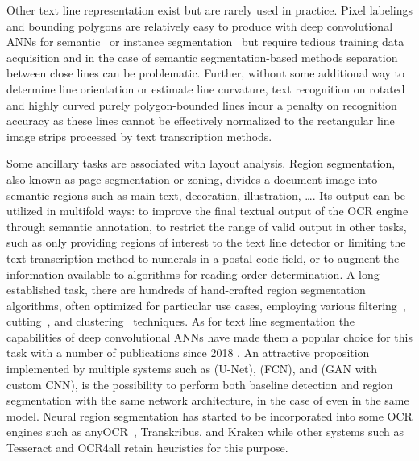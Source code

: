 Other text line representation exist but are rarely used in practice. Pixel
labelings and bounding polygons are relatively easy to produce with deep
convolutional ANNs for semantic~\cite{pastor2016complete,alberti2019labeling}
or instance segmentation~\cite{prusty2019indiscapes} but require tedious
training data acquisition and in the case of semantic segmentation-based
methods separation between close lines can be problematic. Further, without
some additional way to determine line orientation or estimate line curvature,
text recognition on rotated and highly curved purely polygon-bounded lines
incur a penalty on recognition accuracy as these lines cannot be effectively
normalized to the rectangular line image strips processed by text transcription
methods. 

Some ancillary tasks are associated with layout analysis. Region segmentation,
also known as page segmentation or zoning, divides a document image into
semantic regions such as main text, decoration, illustration, \dots. Its output
can be utilized in multifold ways: to improve the final textual output of the
OCR engine through semantic annotation, to restrict the range of valid output
in other tasks, such as only providing regions of interest to the text line
detector or limiting the text transcription method to numerals in a postal code
field, or to augment the information available to algorithms for reading order
determination. A long-established task, there are hundreds of hand-crafted
region segmentation algorithms, often optimized for particular use cases,
employing various filtering~\cite{PAVLIDIS1992484},
cutting~\cite{ha1995recursive,kruatrachue2005fast}, and
clustering~\cite{drivas1995page,kise1998segmentation} techniques. As for text
line segmentation the capabilities of deep convolutional ANNs have made them a
popular choice for this task with a number of publications since 2018
\cite{wick2018fully,oliveira2018dhsegment,xu2018multi,quiros2018multi,he2017multi,chen2017convolutional,monnier2020docextractor}.
An attractive proposition implemented by multiple systems such as
\cite{oliveira2018dhsegment} (U-Net), \cite{xu2018multi} (FCN), and
\cite{quiros2018multi} (GAN with custom CNN), is the possibility to perform
both baseline detection and region segmentation with the same network
architecture, in the case of \cite{quiros2018multi,xu2018multi} even in the
same model. Neural region segmentation has started to be incorporated into some
OCR engines such as anyOCR~\cite{bukhari2017anyocr}, Transkribus, and Kraken
while other systems such as Tesseract and OCR4all retain heuristics for this
purpose.

